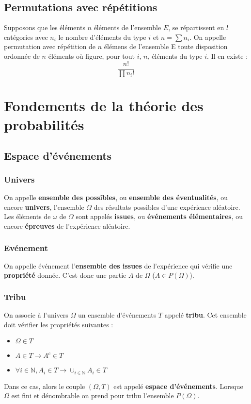 \documentclass[10pt,a4paper,twoside]{article}
\begin{document}
\subsection{Permutations avec répétitions}
Supposons que les éléments $n$ éléments de l'ensemble $E$, se répartissent en $l$ catégories avec $n_{i}$ le nombre d'éléments du type $i$ et $n=\sum n_{i}$. On appelle permutation avec répétition de $n$ élémens de l'ensemble E toute disposition ordonnée de $n$ éléments où figure, pour tout $i$, $n_{i}$ éléments du type $i$. Il en existe :
$$\frac{n!}{\prod n_{i}!}$$


\section{Fondements de la théorie des probabilités}
\subsection{Espace d'événements}
\subsubsection{Univers}
On appelle \textbf{ensemble des possibles}, ou \textbf{ensemble des éventualités}, ou encore \textbf{univers}, l'ensemble $\Omega$ des résultats possibles d'une expérience aléatoire. Les éléments de $\omega$ de $\Omega$ sont appelés \textbf{issues}, ou \textbf{événements élémentaires}, ou encore \textbf{épreuves} de l'expérience aléatoire.


\subsubsection{Evénement}
On appelle événement l'\textbf{ensemble des issues} de l'expérience qui vérifie une \textbf{propriété} donnée. C'est donc une partie $A$ de $\Omega$ ($A\in P(\Omega)$).

\subsubsection{Tribu}
On associe à l'univers $\Omega$ un ensemble d'événements $T$ appelé \textbf{tribu}. Cet ensemble doit vérifier les propriétés suivantes :
\begin{itemize}
\item $\Omega \in T$
\item $A\in T \rightarrow A^{c}\in T$
\item $\forall i \in \mathbb{N}, A_{i}\in T \rightarrow \cup_{i\in \mathbb{N}} A_{i}\in T$
\end{itemize}
Dans ce cas, alors le couple $(\Omega,T)$ est appelé \textbf{espace d'événements}. Lorsque $\Omega$ est fini et dénombrable on prend pour tribu l'ensemble $P(\Omega)$.
\end{document}
